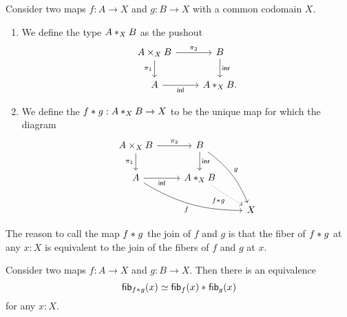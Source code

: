 \begin{defn}
  Consider two maps $f:A\to X$ and $g:B\to X$ with a common codomain $X$.
  \begin{enumerate}
  \item We define the type $\join[X]{A}{B}$ as the pushout
    \begin{equation*}
      \begin{tikzcd}
        A\times_X B \arrow[r,"\pi_2"] \arrow[d,swap,"\pi_1"] & B \arrow[d,"\inr"] \\
        A \arrow[r,swap,"\inl"] & \join[X]{A}{B}.
      \end{tikzcd}
    \end{equation*}
  \item We define the  $\join{f}{g}:\join[X]{A}{B}\to X$ to be the unique map for which the diagram
        \begin{equation*}
      \begin{tikzcd}
        A\times_X B \arrow[r,"\pi_2"] \arrow[d,swap,"\pi_1"] & B \arrow[d,"\inr"] \arrow[ddr,bend left=15,"g"] \\
        A \arrow[r,swap,"\inl"] \arrow[drr,bend right=15,swap,"f"]  & \join[X]{A}{B} \arrow[dr,densely dotted,swap,"\join{f}{g}"] \\
        & & X
      \end{tikzcd}
    \end{equation*}
  \end{enumerate}
\end{defn}

The reason to call the map $\join{f}{g}$ the join of $f$ and $g$ is that the fiber of $\join{f}{g}$ at any $x:X$ is equivalent to the join of the fibers of $f$ and $g$ at $x$.

\begin{lem}
  Consider two maps $f:A\to X$ and $g:B\to X$. Then there is an equivalence
  \begin{equation*}
    \fib{\join{f}{g}}{x}\simeq\join{\fib{f}{x}}{\fib{g}{x}}
  \end{equation*}
  for any $x:X$.
\end{lem}

